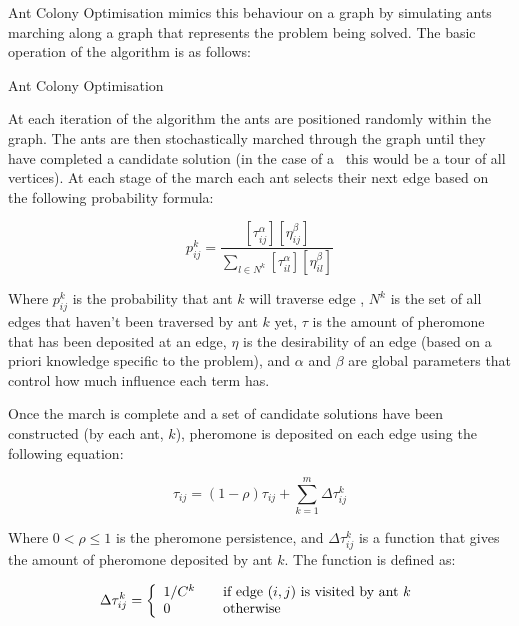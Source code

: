 
Ant Colony Optimisation mimics this behaviour on a graph by simulating ants marching along a graph that represents the problem being solved. The basic operation of the algorithm is as follows: 

\begin{algorithm}[H]
   \caption{Ant Colony Optimisation}
\end{algorithm}
 
At each iteration of the algorithm the ants are positioned randomly within the graph. The ants are then stochastically marched through the graph until they have completed a candidate solution (in the case of a \TSP\ this would be a tour of all vertices). At each stage of the march each ant selects their next edge based on the following probability formula:

\[
   p_{ij}^k = \frac{ [\tau_{ij}^{\alpha}] [\eta_{ij}^{\beta}] }{ \sum_{l \in N^k} [\tau_{il}^{\alpha}] [\eta_{il}^{\beta}] }
\]

Where $p_{ij}^k$ is the probability that ant $k$ will traverse edge , $N^k$ is the set of all edges that haven't been traversed by ant $k$ yet, $\tau$ is the amount of pheromone that has been deposited at an edge, $\eta$ is the desirability of an edge (based on a priori knowledge specific to the problem), and $\alpha$ and $\beta$ are global parameters that control how much influence each term has.

Once the march is complete and a set of candidate solutions have been constructed (by each ant, $k$), pheromone is deposited on each edge using the following equation:

\[
   \tau_{ij} = (1 - \rho) \tau_{ij} + \sum_{k=1}^m \Delta \tau_{ij}^k
\]

Where $0 < \rho \le 1$ is the pheromone persistence, and $\Delta \tau_{ij}^k$ is a function that gives the amount of pheromone deposited by ant $k$. The function is defined as:

\[
   \Delta \tau_{ij}^k = \left\{
   \begin{array}{l l}
     1 / C^k & \quad \text{if edge $(i,j)$ is visited by ant $k$} \\
     0       & \quad \text{otherwise} \\
   \end{array} \right.
\]

